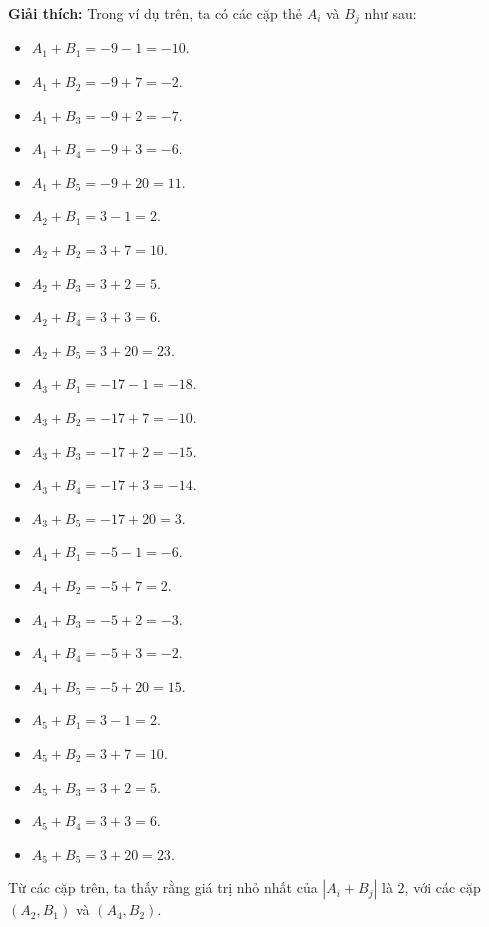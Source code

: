 \documentclass[12pt]{scrartcl}  %
\begin{document}
\textbf{Giải thích:}
Trong ví dụ trên, ta có các cặp thẻ $A_i$ và $B_j$ như sau:
\begin{itemize}
    \item $A_1 + B_1 = -9 - 1 = -10$.
    \item $A_1 + B_2 = -9 + 7 = -2$.
    \item $A_1 + B_3 = -9 + 2 = -7$.
    \item $A_1 + B_4 = -9 + 3 = -6$.
    \item $A_1 + B_5 = -9 + 20 = 11$.
    \item $A_2 + B_1 = 3 - 1 = 2$.
    \item $A_2 + B_2 = 3 + 7 = 10$.
    \item $A_2 + B_3 = 3 + 2 = 5$.
    \item $A_2 + B_4 = 3 + 3 = 6$.
    \item $A_2 + B_5 = 3 + 20 = 23$.
    \item $A_3 + B_1 = -17 - 1 = -18$.
    \item $A_3 + B_2 = -17 + 7 = -10$.
    \item $A_3 + B_3 = -17 + 2 = -15$.
    \item $A_3 + B_4 = -17 + 3 = -14$.
    \item $A_3 + B_5 = -17 + 20 = 3$.
    \item $A_4 + B_1 = -5 - 1 = -6$.
    \item $A_4 + B_2 = -5 + 7 = 2$.
    \item $A_4 + B_3 = -5 + 2 = -3$.
    \item $A_4 + B_4 = -5 + 3 = -2$.
    \item $A_4 + B_5 = -5 + 20 = 15$.
    \item $A_5 + B_1 = 3 - 1 = 2$.
    \item $A_5 + B_2 = 3 + 7 = 10$.
    \item $A_5 + B_3 = 3 + 2 = 5$.
    \item $A_5 + B_4 = 3 + 3 = 6$.
    \item $A_5 + B_5 = 3 + 20 = 23$.
\end{itemize}
Từ các cặp trên, ta thấy rằng giá trị nhỏ nhất của $|A_i + B_j|$ là $2$, với các cặp $(A_2, B_1)$ và $(A_4, B_2)$.
\end{document}
